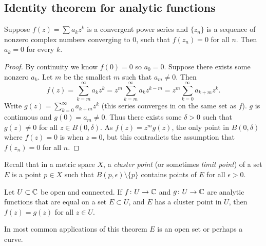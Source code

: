 \subsection{Identity theorem for analytic functions}

\begin{lemma}
Suppose $f(z) = \sum a_k z^k$ is a convergent power series and
$\{ z_n \}$ is a sequence of nonzero complex numbers converging to 0,
such that $f(z_n) = 0$ for all $n$.  Then $a_k = 0$ for every $k$.
\end{lemma}

\begin{proof}
By continuity we know $f(0) = 0$ so $a_0 = 0$.
Suppose there exists some nonzero $a_k$.
Let $m$ be the smallest $m$ such that $a_m \not= 0$.  Then
\begin{equation*}
f(z) = \sum_{k=m}^\infty a_k z^k = 
z^m \sum_{k=m}^\infty a_k z^{k-m} =
z^m \sum_{k=0}^\infty a_{k+m} z^{k} .
\end{equation*}
Write $g(z) = \sum_{k=0}^\infty a_{k+m} z^{k}$ (this series converges in
on the same set as $f$).  $g$ is continuous and $g(0) = a_m \not= 0$.  Thus
there exists some $\delta > 0$ such that $g(z) \not= 0$ for all $z \in
B(0,\delta)$.  As $f(z) = z^m g(z)$, the only point in $B(0,\delta)$ where
$f(z) = 0$ is when $z=0$, but this contradicts the assumption
that $f(z_n) = 0$ for all $n$.
\end{proof}

Recall that in a metric space $X$, a \emph{cluster point}
(or sometimes \emph{limit point}) of a set
$E$ is a point $p \in X$ such that
$B(p,\epsilon) \setminus \{ p \}$ contains points of $E$
for all $\epsilon > 0$.

\begin{thm}
\label{thm:identityanalytic}%
%
Let $U \subset {\mathbb{C}}$ be open and connected.  If $f \colon U \to {\mathbb{C}}$
and $g \colon U \to {\mathbb{C}}$ are analytic functions that are
equal on a set $E \subset U$, and $E$ has a cluster point
in $U$, then $f(z) = g(z)$ for all $z \in U$.
\end{thm}

In most common applications of this theorem $E$ is an open set or perhaps a curve.

